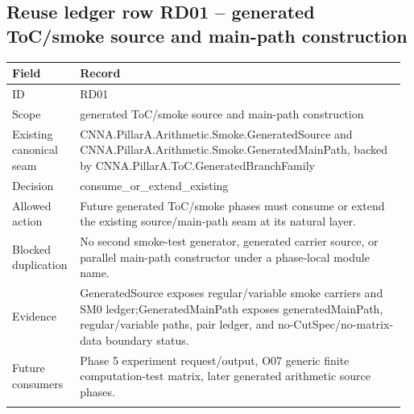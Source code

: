 \small
{}
\subsection*{Reuse ledger row RD01 -- generated ToC/\allowbreak{}smoke source and main-path construction}
\begin{longtable}{L{0.16\linewidth} L{0.81\linewidth}}
\hline
\textbf{Field} & \textbf{Record}\\
\hline
ID & RD01\\
\hline\addlinespace[0.20em]
Scope & generated ToC/\allowbreak{}smoke source and main-path construction\\
\hline\addlinespace[0.20em]
Existing canonical seam & CNNA.PillarA.Arithmetic.Smoke.GeneratedSource and CNNA.PillarA.Arithmetic.Smoke.GeneratedMainPath, backed by CNNA.PillarA.ToC.GeneratedBranchFamily\\
\hline\addlinespace[0.20em]
Decision & consume\_or\_extend\_existing\\
\hline\addlinespace[0.20em]
Allowed action & Future generated ToC/\allowbreak{}smoke phases must consume or extend the existing source/\allowbreak{}main-path seam at its natural layer.\\
\hline\addlinespace[0.20em]
Blocked duplication & No second smoke-test generator, generated carrier source, or parallel main-path constructor under a phase-local module name.\\
\hline\addlinespace[0.20em]
Evidence & GeneratedSource exposes regular/\allowbreak{}variable smoke carriers and SM0 ledger;\newline GeneratedMainPath exposes generatedMainPath, regular/\allowbreak{}variable paths, pair ledger, and no-CutSpec/\allowbreak{}no-matrix-data boundary status.\\
\hline\addlinespace[0.20em]
Future consumers & Phase 5 experiment request/\allowbreak{}output, O07 generic finite computation-test matrix, later generated arithmetic source phases.\\
\hline\addlinespace[0.20em]
\end{longtable}
